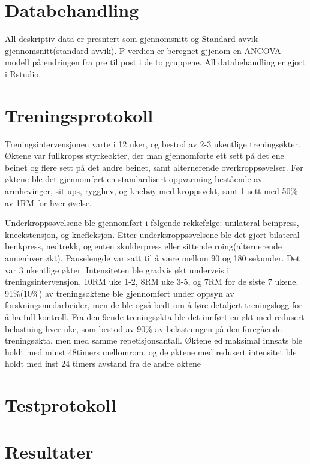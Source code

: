 \documentclass[
]{book}
\begin{document}
\hypertarget{databehandling}{%
\section{Databehandling}\label{databehandling}}

All deskriptiv data er presntert som gjennomsnitt og Standard avvik gjennomsnitt(standard avvik). P-verdien er beregnet gjjenom en ANCOVA modell på endringen fra pre til post i de to gruppene. All databehandling er gjort i Rstudio.

\hypertarget{treningsprotokoll}{%
\section{Treningsprotokoll}\label{treningsprotokoll}}

Treningsintervensjonen varte i 12 uker, og bestod av 2-3 ukentlige treningsøkter. Øktene var fullkropss styrkeøkter, der man gjennomførte ett sett på det ene beinet og flere sett på det andre beinet, samt alternerende overkroppsøvelser. Før øktene ble det gjennomført en standardisert oppvarming bestående av armhevinger, sit-ups, rygghev, og knebøy med kroppsvekt, sant 1 sett med 50\% av 1RM for hver øvelse.

Underkroppsøvelsene ble gjennomført i følgende rekkefølge: unilateral beinpress, kneekstensjon, og knefleksjon. Etter underksroppsøvelsene ble det gjort bilateral benkpress, nedtrekk, og enten skulderpress eller sittende roing(alternerende annenhver økt). Pauselengde var satt til å være mellom 90 og 180 sekunder. Det var 3 ukentlige økter. Intensiteten ble gradvis økt underveis i treningsintervensjon, 10RM uke 1-2, 8RM uke 3-5, og 7RM for de siste 7 ukene. 91\%(10\%) av treningsøktene ble gjennomført under oppsyn av forskningsmedarbeider, men de ble også bedt om å føre detaljert treningslogg for å ha full kontroll. Fra den 9ende treningsøkta ble det innført en økt med redusert belastning hver uke, som bestod av 90\% av belastningen på den foregående treningsøkta, men med samme repetisjonsantall. Øktene ed maksimal innsats ble holdt med minst 48timers mellomrom, og de øktene med redusert intensitet ble holdt med inst 24 timers avstand fra de andre øktene

\hypertarget{testprotokoll}{%
\section{Testprotokoll}\label{testprotokoll}}

\hypertarget{resultater-1}{%
\section{Resultater}\label{resultater-1}}
\end{document}
